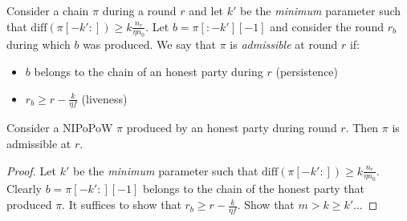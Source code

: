 \begin{definition}
  Consider a chain $\pi$ during a round $r$ and let $k'$
  be the \emph{minimum} parameter such that
  $\text{diff}(\pi[-k':]) \geq k \frac{n_r}{\eta n_0}$.
  Let $b = \pi[:-k'][-1]$ and consider the round $r_b$ during
  which $b$ was produced.
  We say that $\pi$ is \emph{admissible} at round $r$ if:
  \begin{itemize}
    \item $b$ belongs to the chain of an honest party during $r$ (persistence)
    \item $r_b \geq r - \frac{k}{\eta f}$ (liveness)
  \end{itemize}
\end{definition}

\begin{lemma}\label{lem:honest-chop}
  Consider a NIPoPoW $\pi$ produced by an honest party during round $r$.
  Then $\pi$ is admissible at $r$.
\end{lemma}
\begin{proof}
  Let $k'$
  be the \emph{minimum} parameter such that
  $\text{diff}(\pi[-k':]) \geq k \frac{n_r}{\eta n_0}$.
  Clearly $b = \pi[-k':][-1]$ belongs to the chain of the honest party that
  produced $\pi$. It suffices to show that $r_b \geq r - \frac{k}{\eta f}$.
  Show that $m > k \geq k'$... 
\end{proof}

